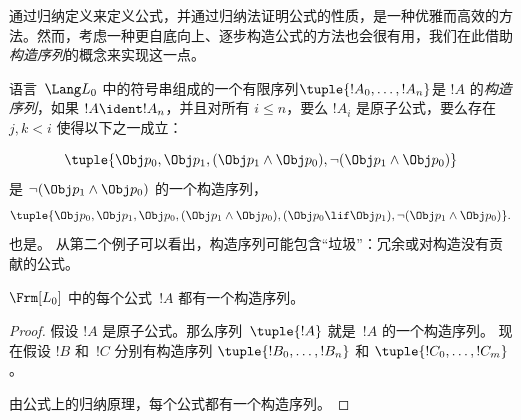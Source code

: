 \documentclass[../../../include/open-logic-section]{subfiles}
\begin{document}


通过归纳定义来定义公式，并通过归纳法证明公式的性质，是一种优雅而高效的方法。然而，考虑一种更自底向上、逐步构造公式的方法也会很有用，我们在此借助\emph{构造序列}的概念来实现这一点。

\begin{defn}[公式的构造序列]
语言~$\Lang L_0$ 中的符号串组成的一个有限序列$\tuple{!A_0,\dotsc,!A_n}$是 $!A$ 的\emph{构造序列}，如果 $!A \ident !A_n$，并且对所有 $i \leq n$，要么 $!A_i$ 是原子公式，要么存在 $j,k < i$ 使得以下之一成立：
\begin{enumerate}
\end{enumerate}
\end{defn}

\begin{ex}
\[
\tuple{
    \Obj p_0,
    \Obj p_1,
    (\Obj p_1 \land \Obj p_0),
    \lnot (\Obj p_1 \land \Obj p_0)
}
\]
是
$\lnot (\Obj p_1 \land \Obj p_0)$
的一个构造序列，
\[
\tuple{
    \Obj p_0,
    \Obj p_1,
    \Obj p_0,
    (\Obj p_1 \land \Obj p_0),
    (\Obj p_0 \lif \Obj p_1),
    \lnot (\Obj p_1 \land \Obj p_0)
}.
\]
也是。%
从第二个例子可以看出，构造序列可能包含“垃圾”：冗余或对构造没有贡献的公式。
\end{ex}

\begin{prop}
$\Frm[L_0]$ 中的每个公式~$!A$ 都有一个构造序列。
\end{prop}

\begin{proof}
假设 $!A$ 是原子公式。那么序列~$\tuple{!A}$ 就是~$!A$ 的一个构造序列。
%
现在假设 $!B$ 和~$!C$ 分别有构造序列
$\tuple{!B_0,\dotsc,!B_n}$ 和 $\tuple{!C_0,\dotsc,!C_m}$。
%
\begin{enumerate}
\end{enumerate}
由公式上的归纳原理，每个公式都有一个构造序列。
\end{proof}
\end{document}
